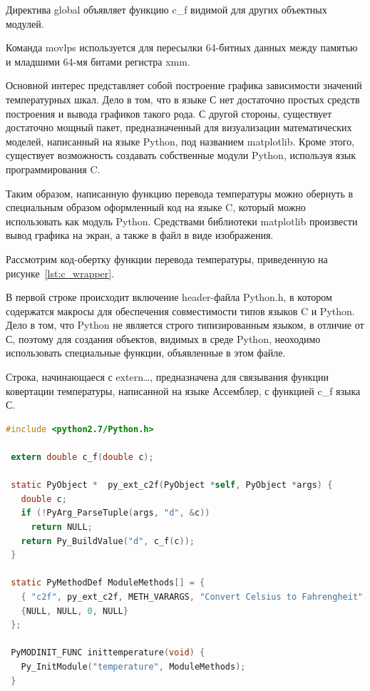 Директива global объявляет функцию c\_f видимой для других объектных модулей. 

Команда movlps используется для пересылки 64-битных данных между памятью и 
младшими 64-мя битами регистра xmm.

Основной интерес представляет собой построение графика зависимости
значений температурных шкал.
Дело в том, что в языке С нет достаточно простых
средств построения и вывода графиков такого рода.
С другой стороны, существует достаточно мощный пакет,
предназначенный для визуализации математических моделей,
написанный на языке Python, под названием matplotlib. 
Кроме этого, существует возможность создавать собственные модули Python,
используя язык программирования C.

Таким образом, написанную функцию перевода температуры можно обернуть
в специальным образом оформленный код на языке C, который можно использовать
как модуль Python. Средствами библиотеки matplotlib произвести вывод графика на экран,
а также в файл в виде изображения.

Рассмотрим код-обертку функции перевода температуры, приведенную на рисунке~\ref{lst:c_wrapper}.

В первой строке происходит включение header-файла Python.h, в котором
содержатся макросы для обеспечения совместимости типов языков C и Python.
Дело в том, что Python не является строго типизированным языком, 
в отличие от С, поэтому для создания объектов, видимых в среде Python, 
неоходимо использовать специальные функции, объявленные в этом файле.

Строка, начинающаеся с extern\dots, предназначена для связывания
функции ковертации температуры, написанной на языке Ассемблер,
с функцией c\_f языка С.

\pagebreak

\begin{lstlisting}[caption=Функция-обертка перевода температуры,
label=lst:c_wrapper,language={C},basicstyle=\scriptsize\ttfamily]
 #include <python2.7/Python.h>

 extern double c_f(double c);

 static PyObject *  py_ext_c2f(PyObject *self, PyObject *args) {
   double c;   
   if (!PyArg_ParseTuple(args, "d", &c))
     return NULL;
   return Py_BuildValue("d", c_f(c));
 }
 
 static PyMethodDef ModuleMethods[] = {
   { "c2f", py_ext_c2f, METH_VARARGS, "Convert Celsius to Fahrengheit" },
   {NULL, NULL, 0, NULL}
 };
 
 PyMODINIT_FUNC inittemperature(void) {
   Py_InitModule("temperature", ModuleMethods);
 }
\end{lstlisting}

